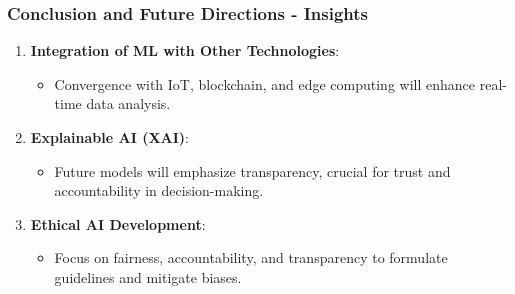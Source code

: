 \documentclass[aspectratio=169]{beamer}
\begin{document}
\begin{frame}[fragile]
    \frametitle{Conclusion and Future Directions - Insights}
    \begin{enumerate}
        \item \textbf{Integration of ML with Other Technologies}:
        \begin{itemize}
            \item Convergence with IoT, blockchain, and edge computing will enhance real-time data analysis.
        \end{itemize}

        \item \textbf{Explainable AI (XAI)}:
        \begin{itemize}
            \item Future models will emphasize transparency, crucial for trust and accountability in decision-making.
        \end{itemize}

        \item \textbf{Ethical AI Development}:
        \begin{itemize}
            \item Focus on fairness, accountability, and transparency to formulate guidelines and mitigate biases.
        \end{itemize}
    \end{enumerate}
\end{frame}
\end{document}
